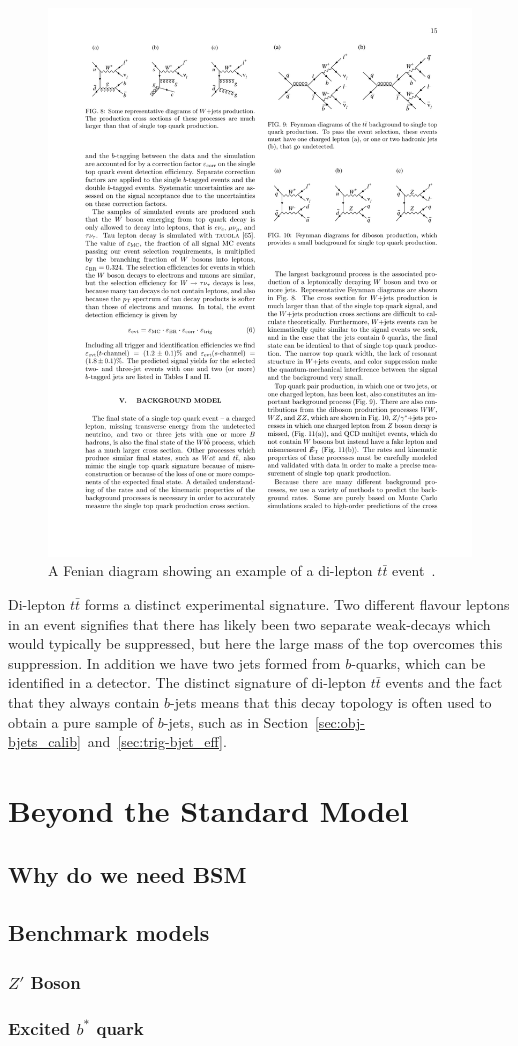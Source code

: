 \begin{figure}[!hbt]
  \begin{center}
    \includegraphics[width=0.7\linewidth, angle=0]{figs/Theory/ttbar.pdf}
  \end{center}
  \caption[A Feynman diagram showing an example of a di-lepton $t\bar{t}$ event.]
  {A Fenian diagram showing an example of a di-lepton $t\bar{t}$ event~\cite{theo-ttbar_feyn}.}
  \label{fig:theo-ttbar}
\end{figure}

Di-lepton $t\bar{t}$ forms a distinct experimental signature.
Two different flavour leptons in an event signifies that there has likely been two separate weak-decays which would typically be suppressed,
but here the large mass of the top overcomes this suppression.
In addition we have two jets formed from $b$-quarks, which can be identified in a detector.
The distinct signature of di-lepton $t\bar{t}$ events and the fact that they always contain $b$-jets
means that this decay topology is often used to obtain a pure sample of $b$-jets, such as in Section~\ref{sec:obj-bjets_calib}~and~\ref{sec:trig-bjet_eff}. 


\section{Beyond the Standard Model}
\label{theo-bsm}

\subsection{Why do we need BSM}
\subsection{Benchmark models}
\subsubsection{$Z'$ Boson}
\subsubsection{Excited $b^*$ quark}
